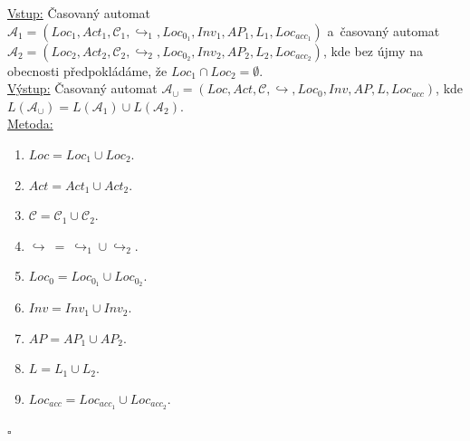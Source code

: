 \documentclass[a4paper, 11pt]{scrartcl}
\newcommand*{\QEDB}{\hfill\ensuremath{\square}}
\begin{document}
    \begin{addmargin}[10pt]{0pt}
        \underline{Vstup:}
            Časovaný automat $ \mathcal{A}_1 = (Loc_1, Act_1, \mathcal{C}_1,
            \hookrightarrow_1, Loc_{0_1}, Inv_1, AP_1, L_1, Loc_{acc_1}) $
            a~časovaný automat $ \mathcal{A}_2 = (Loc_2, Act_2, \mathcal{C}_2,
            \hookrightarrow_2, Loc_{0_2}, Inv_2, AP_2, L_2, Loc_{acc_2}) $, kde
            bez újmy na obecnosti předpokládáme, že $ Loc_1 \cap Loc_2 =
            \emptyset $.
        \\[5pt]
        \underline{Výstup:}
            Časovaný automat $ \mathcal{A}_\cup = (Loc, Act, \mathcal{C},
            \hookrightarrow, Loc_0, Inv, AP, L, Loc_{acc}) $, kde
            $ L(\mathcal{A}_\cup) = L(\mathcal{A}_1) \cup L(\mathcal{A}_2) $.
        \\[5pt]
        \underline{Metoda:}
            \begin{enumerate}
                \item
                    $ Loc = Loc_1 \cup Loc_2 $.

                \item
                    $ Act = Act_1 \cup Act_2 $.

                \item
                    $ \mathcal{C} = \mathcal{C}_1 \cup \mathcal{C}_2 $.

                \item
                    $ \hookrightarrow\ =\ \hookrightarrow_1 \cup
                    \hookrightarrow_2 $.

                \item
                    $ Loc_0 = Loc_{0_1} \cup Loc_{0_2} $.

                \item
                    $ Inv = Inv_1 \cup Inv_2 $.

                \item
                    $ AP = AP_1 \cup AP_2 $.

                \item
                    $ L = L_1 \cup L_2 $.

                \item
                    $ Loc_{acc} = Loc_{acc_1} \cup Loc_{acc_2} $.
            \end{enumerate}
    \end{addmargin}
    \QEDB
\end{document}
